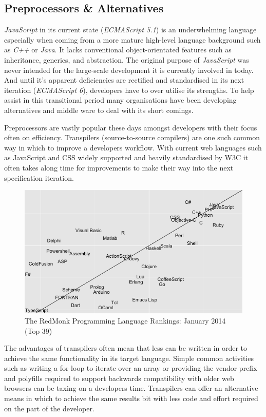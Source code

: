 \documentclass[final]{cmpreport}
\begin{document}
\subsection{Preprocessors \& Alternatives}
\textit{JavaScript} in its current state (\textit{ECMAScript 5.1}) is an underwhelming language especially when coming from a more mature high-level language background such as \textit{C++} or \textit{Java}. It lacks conventional object-orientated features such as inheritance, generics, and abstraction. The original purpose of \textit{JavaScript} was never intended for the large-scale development it is currently involved in today. And until it's apparent deficiencies are rectified and standardised in its next iteration (\textit{ECMAScript 6}), developers have to over utilise its strengths. To help assist in this transitional period many organisations have been developing alternatives and middle ware to deal with its short comings.

Preprocessors are vastly popular these days amongst developers with their focus often on efficiency. Transpilers (source-to-source compilers) are one such common way in which to improve a developers workflow. With current web languages such as JavaScript and CSS widely supported and heavily standardised by W3C it often takes along time for improvements to make their way into the next specification iteration.
\begin{figure}[h]
  \includegraphics[width=1.0\textwidth]{lang-rank-114-wm.png}
  \caption[The RedMonk Programming Language Rankings: January 2014 (Top 39)]{The RedMonk Programming Language Rankings: January 2014 (Top 39)}
\end{figure}
The advantages of transpilers often mean that less can be written in order to achieve the same functionality in its target language. Simple common activities such as writing a for loop to iterate over an array or providing the vendor prefix and polyfills required to support backwards compatibility with older web browsers can be taxing on a developers time. Transpilers can offer an alternative means in which to achieve the same results bit with less code and effort required on the part of the developer.
\end{document}
